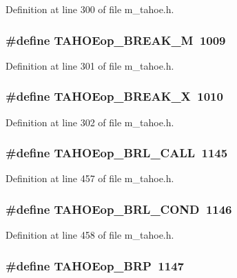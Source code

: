 Definition at line 300 of file m\_\-tahoe.h.
\subsubsection{\setlength{\rightskip}{0pt plus 5cm}\#define TAHOEop\_\-BREAK\_\-M~1009}\label{m__tahoe_8h_9a22e8659bb639b5a4191577d4637020}




Definition at line 301 of file m\_\-tahoe.h.
\subsubsection{\setlength{\rightskip}{0pt plus 5cm}\#define TAHOEop\_\-BREAK\_\-X~1010}\label{m__tahoe_8h_acc2ca83493d0aba7ef3ffa0a750823a}




Definition at line 302 of file m\_\-tahoe.h.
\subsubsection{\setlength{\rightskip}{0pt plus 5cm}\#define TAHOEop\_\-BRL\_\-CALL~1145}\label{m__tahoe_8h_26e88d39317d14c1be9148a89c59d8ed}




Definition at line 457 of file m\_\-tahoe.h.
\subsubsection{\setlength{\rightskip}{0pt plus 5cm}\#define TAHOEop\_\-BRL\_\-COND~1146}\label{m__tahoe_8h_a45d3f11644ced65a1c54c490bff44d4}




Definition at line 458 of file m\_\-tahoe.h.
\subsubsection{\setlength{\rightskip}{0pt plus 5cm}\#define TAHOEop\_\-BRP~1147}\label{m__tahoe_8h_938b8cda089286b717307517bba8c19c}




